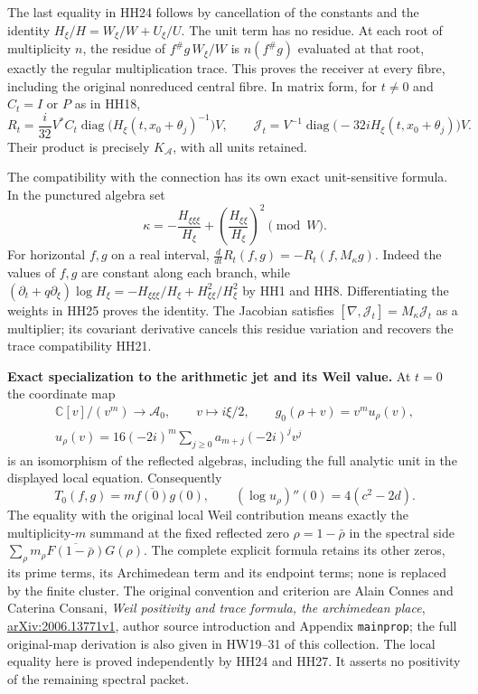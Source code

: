 \documentclass[11pt,a4paper]{article}
\theoremstyle{definition}\newtheorem{definition}[theorem]{Definition}
\begin{document}
The last equality in HH24 follows by cancellation of the constants
and the identity
$H_\xi/H=W_\xi/W+U_\xi/U$. The unit term has no residue.
At each root of multiplicity $n$, the residue of
$f^\#g\,W_\xi/W$ is $n(f^\#g)$ evaluated at that root, exactly the
regular multiplication trace. This proves the receiver at every
fibre, including the original nonreduced central fibre.
In matrix form, for $t\ne0$ and $C_t=I$ or $P$ as in HH18,
\[
 R_t=\frac{i}{32}V^*C_t
       \operatorname{diag}\bigl(H_\xi(t,x_0+\theta_j)^{-1}\bigr)V,
 \qquad
 \mathcal J_t=V^{-1}
       \operatorname{diag}\bigl(-32iH_\xi(t,x_0+\theta_j)\bigr)V .
 \tag{HH25}\label{hh:residue-matrix}
\]
Their product is precisely $K_{\mathcal A}$, with all units retained.

The compatibility with the connection has its own exact unit-sensitive
formula. In the punctured algebra set
\[
 \kappa=-\frac{H_{\xi\xi\xi}}{H_\xi}
                +\left(\frac{H_{\xi\xi}}{H_\xi}\right)^2\pmod W.
 \tag{HH26}
\]
For horizontal $f,g$ on a real interval,
$\frac{d}{dt}R_t(f,g)=-R_t(f,M_\kappa g)$.
Indeed the values of $f,g$ are constant along each branch, while
$(\partial_t+q\partial_\xi)\log H_\xi
=-H_{\xi\xi\xi}/H_\xi+H_{\xi\xi}^2/H_\xi^2$ by HH1 and HH8.
Differentiating the weights in HH25 proves the identity. The
Jacobian satisfies $[\nabla,\mathcal J_t]=M_\kappa\mathcal J_t$ as
a multiplier; its covariant derivative cancels this residue variation and
recovers the trace compatibility HH21.

\HH\textbf{Exact specialization to the arithmetic jet and its Weil value.}
At $t=0$ the coordinate map
\[
 \begin{gathered}
 \mathbb C[v]/(v^m)\longrightarrow\mathcal A_0,\qquad
 v\longmapsto i\xi/2,\qquad g_0(\rho+v)=v^m u_\rho(v),\\
 u_\rho(v)=16(-2i)^m\sum_{j\ge0}a_{m+j}(-2i)^jv^j
 \end{gathered}
 \tag{HH27}\label{hh:arithmetic-unit}
\]
is an isomorphism of the reflected algebras, including the full
analytic unit in the displayed local equation.
Consequently
\[
 T_0(f,g)=m\overline{f(0)}g(0),\qquad
 (\log u_\rho)''(0)=4(c^2-2d).
 \tag{HH28}
\]
The equality with the original local Weil contribution means exactly
the multiplicity-$m$ summand at the fixed reflected zero
$\rho=1-\bar\rho$ in the spectral side
$\sum_\rho m_\rho\overline{F(1-\bar\rho)}G(\rho)$.
The complete explicit formula retains its other zeros, its prime
terms, its Archimedean term and its endpoint terms; none is replaced
by the finite cluster. The original convention and criterion are
Alain Connes and Caterina Consani,
\emph{Weil positivity and trace formula, the archimedean place},
\href{https://arxiv.org/abs/2006.13771v1}{arXiv:2006.13771v1},
author source introduction and Appendix \texttt{mainprop};
the full original-map derivation is also given in HW19--31 of this
collection. The local equality here is proved independently by HH24
and HH27. It asserts no positivity of the remaining spectral packet.
\end{document}
